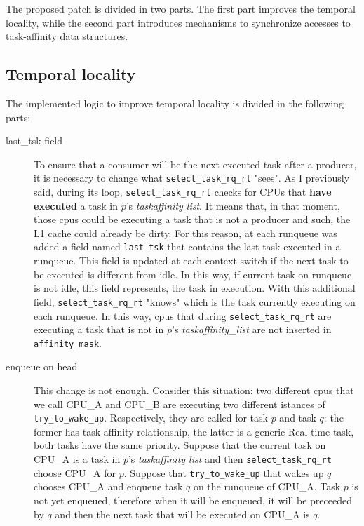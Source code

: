 The proposed patch is divided in two parts. The first part improves the temporal locality, while the second part introduces mechanisms to synchronize 
accesses to task-affinity data structures.

\subsection{Temporal locality}

The implemented logic to improve temporal locality is divided in the following parts:

\begin{description}

\item[last\_tsk field] To ensure that a consumer will be the next executed task after a producer, it is necessary to change what 
\texttt{select\_task\_rq\_rt} "sees". As I previously said, during its loop, \texttt{select\_task\_rq\_rt} checks for CPUs that \textbf{have executed} a 
task in $p$'s \textit{taskaffinity list}. It means that, in that moment, those cpus could be executing a task that is not a producer and such, the L1 cache 
could already be dirty. For this reason, at each runqueue was added a field named \texttt{last\_tsk} that contains the last task executed in a runqueue. 
This field is updated at each context switch if the next task to be executed is different from idle. In this way, if current task on runqueue is not idle, 
this field represents, the task in execution. With this additional field, \texttt{select\_task\_rq\_rt} "knows" which is the task currently executing on 
each runqueue. In this way, cpus that during \texttt{select\_task\_rq\_rt} are executing a task that is not in $p$'s \textit{taskaffinity\_list} are not 
inserted in \texttt{affinity\_mask}.

\item[enqueue on head] This change is not enough. Consider this situation: two different cpus that we call CPU\_A and CPU\_B are executing two different 
istances of \texttt{try\_to\_wake\_up}. Respectively, they are called for task $p$ and task $q$: the former has task-affinity relationship, the latter is 
a generic Real-time task, both tasks have the same priority. Suppose that the current task on CPU\_A is a task in $p$'s \textit{taskaffinity list} and then 
\texttt{select\_task\_rq\_rt} choose CPU\_A for $p$. Suppose that \texttt{try\_to\_wake\_up} that wakes up $q$ chooses CPU\_A and enqueue task $q$ on the 
runqueue of CPU\_A. Task $p$ is not yet enqueued, therefore when it will be enqueued, it will be preceeded by $q$ and then the next task that will
be executed on CPU\_A is $q$.


\end{description}
